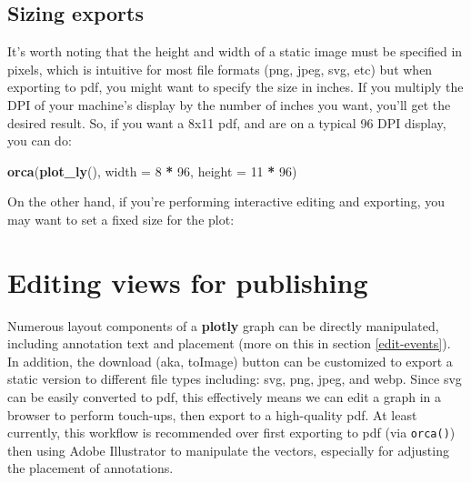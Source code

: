 \documentclass[
  12pt,
]{krantz}
\newenvironment{Shaded}{\begin{snugshade}}{\end{snugshade}}
\newcommand{\DataTypeTok}[1]{\textcolor[rgb]{0.13,0.29,0.53}{#1}}
\newcommand{\DecValTok}[1]{\textcolor[rgb]{0.00,0.00,0.81}{#1}}
\newcommand{\KeywordTok}[1]{\textcolor[rgb]{0.13,0.29,0.53}{\textbf{#1}}}
\newcommand{\NormalTok}[1]{#1}
\newcommand{\OperatorTok}[1]{\textcolor[rgb]{0.81,0.36,0.00}{\textbf{#1}}}
\newcommand{\StringTok}[1]{\textcolor[rgb]{0.31,0.60,0.02}{#1}}
\begin{document}
\hypertarget{sizing-exports}{%
\section{Sizing exports}\label{sizing-exports}}

It's worth noting that the height and width of a static image must be specified in pixels, which is intuitive for most file formats (png, jpeg, svg, etc) but when exporting to pdf, you might want to specify the size in inches. If you multiply the DPI of your machine's display by the number of inches you want, you'll get the desired result. So, if you want a 8x11 pdf, and are on a typical 96 DPI display, you can do:

\begin{Shaded}
\begin{Highlighting}[]
\KeywordTok{orca}\NormalTok{(}\KeywordTok{plot_ly}\NormalTok{(), }\DataTypeTok{width =} \DecValTok{8} \OperatorTok{*}\StringTok{ }\DecValTok{96}\NormalTok{, }\DataTypeTok{height =} \DecValTok{11} \OperatorTok{*}\StringTok{ }\DecValTok{96}\NormalTok{)}
\end{Highlighting}
\end{Shaded}

On the other hand, if you're performing interactive editing and exporting, you may want to set a fixed size for the plot:

\begin{Shaded}
\end{Shaded}

\hypertarget{editing-views}{%
\chapter{Editing views for publishing}\label{editing-views}}

Numerous layout components of a \textbf{plotly} graph can be directly manipulated, including annotation text and placement (more on this in section \ref{edit-events}). In addition, the download (aka, toImage) button can be customized to export a static version to different file types including: svg, png, jpeg, and webp. Since svg can be easily converted to pdf, this effectively means we can edit a graph in a browser to perform touch-ups, then export to a high-quality pdf. At least currently, this workflow is recommended over first exporting to pdf (via \texttt{orca()}) then using Adobe Illustrator to manipulate the vectors, especially for adjusting the placement of annotations.
\end{document}
